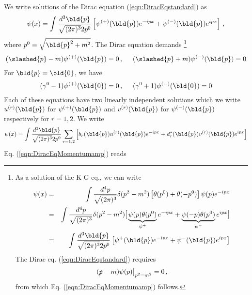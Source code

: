 We write solutions of the Dirac equation (\ref{eqn:DiracEqstandard}) as
\begin{eqnarray}
\psi(x) = \int \frac{d^3 \bld{p}}{\sqrt{(2\pi)^3} 2 p^0}
 \left[
\psi^{(+)}(\bld{p}) e^{-ipx} + \psi^{(-)}(\bld{p}) e^{ipx}
\right]\,,
\end{eqnarray}
where $p^0 = \sqrt{\bld{p}^2 + m^2}$.
The Dirac equation demands
\footnote{
As  a solution of the K-G eq., we can write
\begin{eqnarray*}
\psi(x) &=& \int \frac{d^4 p}{\sqrt{(2\pi)^3}}
\delta(p^2 - m^2) 
 \left[
 \theta(p^0) +  \theta(-p^0) \right]
 \psi(p) e^{-ipx}
\\
&=&
\int \frac{d^4 p}{\sqrt{(2\pi)^3}}
\delta(p^2 - m^2)  
{\large \mbox{[}}
\underbrace{\psi(p)\theta(p^0)}_{\psi^{+}}  e^{-ipx} + 
\underbrace{\psi(-p)\theta(p^0)}_{\psi^{-}}  e^{ipx}
{\large \mbox{]}}
\\
&=&
\int \frac{d^3 \bld{p}}{\sqrt{(2\pi)^3}2p^0}
\left[
\psi^{+}(\bld{p})  e^{-ipx} + \psi^{-}(\bld{p})  e^{ipx}
\right]
\end{eqnarray*}
The Dirac eq. (\ref{eqn:DiracEqstandard}) requires
\begin{eqnarray*}
\left. (\slashed{p} - m) \psi(p) \right|_{p^2 = m^2} = 0\,,
\end{eqnarray*}
from which Eq. (\ref{eqn:DiracEqMomentumamp}) follows.
}%
\begin{eqnarray}
(\slashed{p} - m) \psi^{(+)}(\bld{p}) = 0\,,
\hspace{5mm}
(\slashed{p} + m) \psi^{(-)}(\bld{p}) = 0
\label{eqn:DiracEqMomentumamp}
\end{eqnarray}
For $\bld{p} = \bld{0}$, we have
\begin{eqnarray*}
(\gamma^0 - 1) \psi^{(+)}(\bld{0}) = 0\,,
\hspace{5mm}
(\gamma^0 + 1) \psi^{(-)}(\bld{0}) = 0
\end{eqnarray*}
\bigskip
Each of these equations have two linearly independent solutions
which we write $u^{(r)}(\bld{p})$ for $\psi^{(+)}(\bld{p})$ and
$v^{(r)}(\bld{p})$ for $\psi^{(-)}(\bld{p})$ respectively for 
$r = 1, 2$.
We write
\begin{eqnarray}
\psi(x) = \int \frac{d^3 \bld{p}}{\sqrt{(2\pi)^3} 2 p^0}
\sum_{r = 1, 2} \left[
b_r(\bld{p}) u^{(r)}(\bld{p}) e^{-ipx} + d_r^*(\bld{p}) v^{(r)}(\bld{p}) e^{ipx}
\right]
\label{eqn:DiracFieldClExpand}
\end{eqnarray}
Eq. (\ref{eqn:DiracEqMomentumamp}) reads
